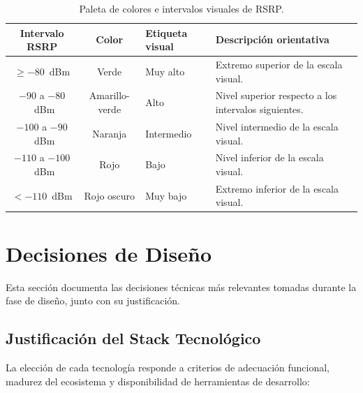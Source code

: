 \begin{table}[H]
\centering
\caption{Paleta de colores e intervalos visuales de RSRP.}
\label{tab:paleta_rsrp}
\footnotesize
\begin{tabularx}{\textwidth}{|c|c|l|X|}
\hline
\textbf{Intervalo RSRP} & \textbf{Color} & \textbf{Etiqueta visual} & \textbf{Descripción orientativa} \\
\hline
$\geq -80$~dBm     & Verde         & Muy alto      & Extremo superior de la escala visual. \\
\hline
$-90$ a $-80$~dBm   & Amarillo-verde & Alto          & Nivel superior respecto a los intervalos
                                                     siguientes. \\
\hline
$-100$ a $-90$~dBm  & Naranja       & Intermedio    & Nivel intermedio de la escala visual. \\
\hline
$-110$ a $-100$~dBm & Rojo          & Bajo          & Nivel inferior de la escala visual. \\
\hline
$< -110$~dBm        & Rojo oscuro   & Muy bajo      & Extremo inferior de la escala visual. \\
\hline
\end{tabularx}
\end{table}

\section{Decisiones de Diseño}
\label{sec:decisiones}

Esta sección documenta las decisiones técnicas más relevantes tomadas durante la fase de
diseño, junto con su justificación.

\subsection{Justificación del Stack Tecnológico}
\label{subsec:just_stack}

La elección de cada tecnología responde a criterios de adecuación funcional, madurez del
ecosistema y disponibilidad de herramientas de desarrollo:

